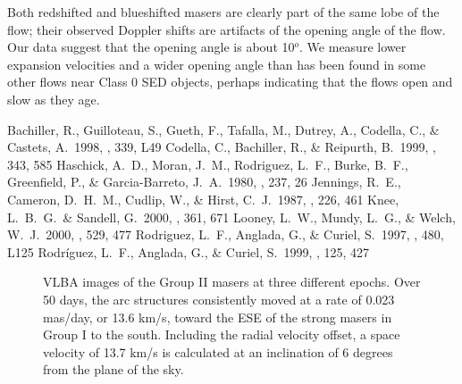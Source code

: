	Both redshifted and blueshifted masers are clearly part of the same lobe of the flow; their observed Doppler shifts are artifacts of the opening angle of the flow.  Our data suggest that the opening angle is about 10$^o$.  We measure lower expansion velocities and a wider opening angle than has been found in some other flows near Class 0 SED objects, perhaps indicating that the flows open and slow as they age.

\begin{references}
 Bachiller, R., 
Guilloteau, S., Gueth, F., Tafalla, M., Dutrey, A., Codella, C., \& 
Castets, A.\ 1998, \aap, 339, L49 
 Codella, C., Bachiller, R., \& Reipurth, B.\ 1999, \aap, 343, 585 
 Haschick, A.\ D., 
Moran, J.\ M., Rodriguez, L.\ F., Burke, B.\ F., Greenfield, P., \& 
Garcia-Barreto, J.\ A.\ 1980, \apj, 237, 26 
Jennings, R.\ E., Cameron, D.\ H.\ M., Cudlip, W., \& Hirst, C.\ J.\ 1987, 
\mnras, 226, 461 
  Knee, L.\ B.\ G.\ \& 
Sandell, G.\ 2000, \aap, 361, 671 
  Looney, L.\ 
W., Mundy, L.\ G., \& Welch, W.\ J.\ 2000, \apj, 529, 477 
 Rodriguez, L.\ F., Anglada, G., \& Curiel, S.\ 1997, \apjl, 480, L125
\reference 
Rodr{\'i}guez, L.\ F., Anglada, G., \& Curiel, S.\ 1999, \apjs, 125, 427 
\end{references}

\begin{figure}

\vspace{1.0in}
\caption{VLBA images of the Group II masers at three different epochs.  Over 50 days, the arc structures consistently  moved at a rate of  0.023 mas/day, or 13.6 km/s, toward the ESE of the strong masers in Group I to the south.
Including the radial velocity offset, a space velocity of 13.7 km/s is calculated at an inclination of 6 degrees from the plane of the sky.}

\end{figure}


